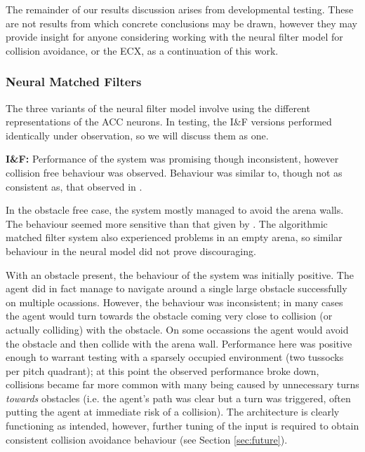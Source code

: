 \documentclass[a4paper,11pt,twoside,openright]{article}
\begin{document}
The remainder of our results discussion arises from developmental testing.
These are not results from which concrete conclusions may
be drawn, however they may provide insight for anyone considering
working with the neural filter model for collision avoidance, or the
ECX, as a continuation of this work.

\subsubsection{Neural Matched Filters}
The three variants of the neural filter model involve using the
different representations of the ACC neurons. In testing, the I\&F
versions performed identically under observation, so we will discuss
them as one.\newline\par

\textbf{I\&F:} Performance of the system was promising though
inconsistent, however collision free behaviour was observed. Behaviour
was similar to, though not as consistent as, that observed in
\cite{Mitchell2018}.
\newline\par

In the obstacle free case, the system mostly managed to avoid the
arena walls. The behaviour seemed more sensitive than
that given by \cite{Mitchell2018}. The algorithmic matched
filter system also experienced problems in an empty arena, so similar
behaviour in the neural model did not prove discouraging.
\newline\par

With an obstacle present, the behaviour of the system was initially
positive. The agent did in fact manage to navigate around a single
large obstacle successfully on multiple ocassions. However, the
behaviour was inconsistent; in many cases the agent would turn towards
the obstacle coming very close to collision (or actually colliding)
with the obstacle. On some occassions the agent would avoid the
obstacle and then collide with the arena wall. Performance here was
positive enough to warrant testing with a sparsely occupied
environment (two tussocks per pitch quadrant); at this point the
observed performance broke down, collisions became far more common
with many being caused by unnecessary turns \textit{towards} obstacles
(i.e. the agent's path was clear but a turn was triggered, often
putting the agent at immediate risk of a collision). The architecture
is clearly functioning as intended, however, further tuning of the
input is required to obtain consistent collision avoidance behaviour
(see Section \ref{sec:future}).
\newline\par
\end{document}
